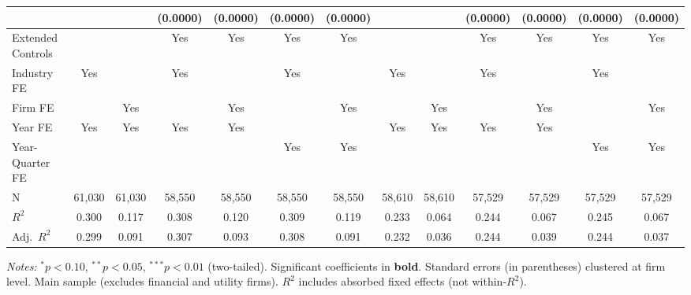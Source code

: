 \begin{landscape}
\begin{table}[H]
\begin{tabular}{lcccccccccccc}
 &  &  & (0.0000) & (0.0000) & (0.0000) & (0.0000) &  &  & (0.0000) & (0.0000) & (0.0000) & (0.0000) \\
\midrule
Extended Controls &  &  & Yes & Yes & Yes & Yes &  &  & Yes & Yes & Yes & Yes \\
Industry FE & Yes &  & Yes &  & Yes &  & Yes &  & Yes &  & Yes &  \\
Firm FE &  & Yes &  & Yes &  & Yes &  & Yes &  & Yes &  & Yes \\
Year FE & Yes & Yes & Yes & Yes &  &  & Yes & Yes & Yes & Yes &  &  \\
Year-Quarter FE &  &  &  &  & Yes & Yes &  &  &  &  & Yes & Yes \\
\midrule
N & 61,030 & 61,030 & 58,550 & 58,550 & 58,550 & 58,550 & 58,610 & 58,610 & 57,529 & 57,529 & 57,529 & 57,529 \\
$R^2$ & 0.300 & 0.117 & 0.308 & 0.120 & 0.309 & 0.119 & 0.233 & 0.064 & 0.244 & 0.067 & 0.245 & 0.067 \\
Adj.~$R^2$ & 0.299 & 0.091 & 0.307 & 0.093 & 0.308 & 0.091 & 0.232 & 0.036 & 0.244 & 0.039 & 0.244 & 0.037 \\
\bottomrule
\end{tabular}
\begin{minipage}{\linewidth}
\vspace{2pt}\scriptsize
\textit{Notes:} $^{*}p<0.10$, $^{**}p<0.05$, $^{***}p<0.01$ (two-tailed).
 Significant coefficients in \textbf{bold}.
 Standard errors (in parentheses) clustered at firm level.
 Main sample (excludes financial and utility firms).
 $R^2$ includes absorbed fixed effects (not within-$R^2$).
\end{minipage}
\end{table}
\end{landscape}